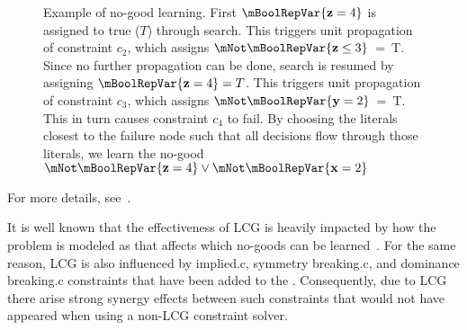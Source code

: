 \begin{figure}
  \caption[Example of no-good learning]%
          {%
            Example of no-good learning.
            First \mbox{$\mBoolRepVar{\mVar{z} = 4}$} is assigned to true ($T$)
            through search.
            This triggers unit propagation of constraint $c_2$, which assigns
            \mbox{$\mNot\mBoolRepVar{\mVar{z} \leq 3}$ = T}.
            Since no further propagation can be done, search is resumed by
            assigning \mbox{$\mBoolRepVar{\mVar{z} = 4} = T$}.
            This triggers unit propagation of constraint $c_3$, which assigns
            \mbox{$\mNot\mBoolRepVar{\mVar{y} = 2}$ = T}.
            This in turn causes constraint $c_4$ to fail.
            By choosing the literals closest to the failure node such that
            all decisions flow through those literals, we learn the no-good
            \mbox{$\mNot\mBoolRepVar{\mVar{z} = 4} \mOr
              \mNot\mBoolRepVar{\mVar{x} = 2}$}%
          }
\end{figure}
%
For more details, see~\cite{MarquesSilvaEtal:2014}.

It is well known that the effectiveness of \gls{LCG} is heavily impacted by how
the problem is modeled as that affects which \glspl{no-good} can be
learned~\cite{SchuttEtAl:2011, ChuStuckey:2013, SchuttEtAl:2016}.
%
For the same reason, \gls{LCG} is also influenced by \gls{implied.c},
\gls{symmetry breaking.c}, and \gls{dominance breaking.c} \glspl{constraint}
that have been added to the .
%
Consequently, due to \gls{LCG} there arise strong synergy effects between such
\glspl{constraint} that would not have appeared when using a non-\gls{LCG}
\gls{constraint solver}.
